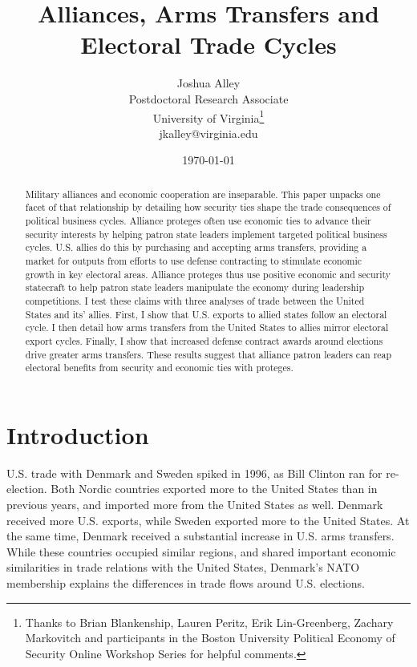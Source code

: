 \documentclass[12pt]{article}
\title{\textbf{Alliances, Arms Transfers and Electoral Trade Cycles}}
\author{Joshua Alley \\
Postdoctoral Research Associate \\
University of Virginia\thanks{Thanks to Brian Blankenship, Lauren Peritz, Erik Lin-Greenberg, Zachary Markovitch and participants in the Boston University Political Economy of Security Online Workshop Series for helpful comments.} \\
jkalley@virginia.edu
}
\date{\today}
\begin{document}
\maketitle 

\begin{abstract}
Military alliances and economic cooperation are inseparable. 
This paper unpacks one facet of that relationship by detailing how security ties shape the trade consequences of political business cycles.
Alliance proteges often use economic ties to advance their security interests by helping patron state leaders implement targeted political business cycles. 
U.S. allies do this by purchasing and accepting arms transfers, providing a market for outputs from efforts to use defense contracting to stimulate economic growth in key electoral areas.
Alliance proteges thus use positive economic and security statecraft to help patron state leaders manipulate the economy during leadership competitions.  
I test these claims with three analyses of trade between the United States and its' allies. 
First, I show that U.S. exports to allied states follow an electoral cycle. 
I then detail how arms transfers from the United States to allies mirror electoral export cycles. 
Finally, I show that increased defense contract awards around elections drive greater arms transfers.
These results suggest that alliance patron leaders can reap electoral benefits from security and economic ties with proteges. 
\end{abstract} 


\newpage 
\doublespace 


\section{Introduction}


U.S. trade with Denmark and Sweden spiked in 1996, as Bill Clinton ran for re-election.
Both Nordic countries exported more to the United States than in previous years, and imported more from the United States as well. 
Denmark received more U.S. exports, while Sweden exported more to the United States.
At the same time, Denmark received a substantial increase in U.S. arms transfers.
While these countries occupied similar regions, and shared important economic similarities in trade relations with the United States, Denmark's NATO membership explains the differences in trade flows around U.S. elections. 
\end{document}
